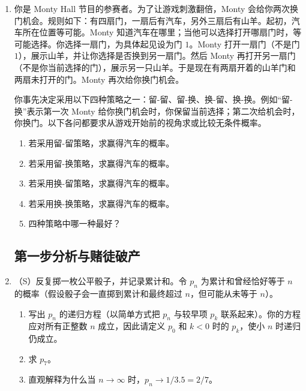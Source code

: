 \documentclass[UTF8, 12pt, fontset=fandol, oneside]{ctexart}
\begin{document}
\begin{enumerate}
  Monty 知道每扇门后的奖品，会打开一扇门（不是参赛者最初选择的门），然后让参赛者选择是否换到另一扇未打开门。Monty 以概率 $p$ 展示（在参赛者最初未选中的 $3$ 扇门中）最不受偏好的奖品，以概率 $1-p$ 展示中间偏好的奖品，绝不展示最受偏好的奖品。

  参赛者事先决定采用如下策略：最初选门 $1$。Monty 开门后，在其余两扇未打开门中随机选择一扇换过去（各以概率 $1/2$）。
  \begin{enumerate}
    \item 求参赛者得到汽车的无条件概率。

    提示：以汽车所在位置为条件。
    \item 求 Monty 展示苹果的无条件概率。

    提示：以门 $1$ 后的奖品为条件。
    \item Monty 现在打开一扇门，展示苹果。给定这一信息，求参赛者得到汽车的条件概率。
  \end{enumerate}

  \item 你是 Monty Hall 节目的参赛者。为了让游戏刺激翻倍，Monty 会给你两次换门机会。规则如下：有四扇门，一扇后有汽车，另外三扇后有山羊。起初，汽车所在位置等可能。Monty 知道汽车在哪里；当他可以选择打开哪扇门时，等可能选择。你选择一扇门，为具体起见设为门 $1$。Monty 打开一扇门（不是门 $1$），展示山羊，并让你选择是否换到另一扇门。然后 Monty 再打开另一扇门（不是你当前选择的门），展示另一只山羊。于是现在有两扇开着的山羊门和两扇未打开的门。Monty 再次给你换门机会。

  你事先决定采用以下四种策略之一：留-留、留-换、换-留、换-换。例如“留-换”表示第一次 Monty 给你换门机会时，你保留当前选择；第二次给机会时，你换门。以下各问都要求从游戏开始前的视角求或比较无条件概率。
  \begin{enumerate}
    \item 若采用留-留策略，求赢得汽车的概率。
    \item 若采用留-换策略，求赢得汽车的概率。
    \item 若采用换-留策略，求赢得汽车的概率。
    \item 若采用换-换策略，求赢得汽车的概率。
    \item 四种策略中哪一种最好？
  \end{enumerate}

\subsection*{第一步分析与赌徒破产}

  \item （S）反复掷一枚公平骰子，并记录累计和。令 $p_n$ 为累计和曾经恰好等于 $n$ 的概率（假设骰子会一直掷到累计和最终超过 $n$，但可能从未等于 $n$）。
  \begin{enumerate}
    \item 写出 $p_n$ 的递归方程（以简单方式把 $p_n$ 与较早项 $p_k$ 联系起来）。你的方程应对所有正整数 $n$ 成立，因此请定义 $p_0$ 和 $k<0$ 时的 $p_k$，使小 $n$ 时递归仍成立。
    \item 求 $p_7$。
    \item 直观解释为什么当 $n\to\infty$ 时，$p_n\to 1/3.5=2/7$。
  \end{enumerate}


\end{enumerate}
\end{document}
